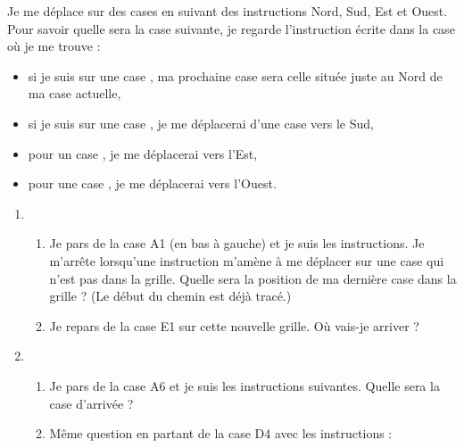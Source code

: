 \documentclass[class=report,crop=false, 12pt]{standalone}
\begin{document}
\begin{activite}

Je me déplace sur des cases en suivant des instructions Nord, Sud, Est et Ouest.
Pour savoir quelle sera la case suivante, je regarde l'instruction écrite dans la case où je me trouve :
\begin{itemize}
  \item si je suis sur une case , ma prochaine case sera celle située juste au Nord de ma case actuelle,
  \item si je suis sur une case , je me déplacerai d'une case vers le Sud,
  \item pour un case , je me déplacerai vers l'Est,
  \item pour une case , je me déplacerai vers l'Ouest.
\end{itemize}


\begin{enumerate}
  \item
  \begin{enumerate}
    \item Je pars de la case A1 (en bas à gauche) et je suis les instructions. Je m'arrête lorsqu'une instruction m'amène à me déplacer sur une case qui n'est pas dans la grille. Quelle sera la position de ma dernière case dans la grille ? (Le début du chemin est déjà tracé.)
    
    
    \item Je repars de la case E1 sur cette nouvelle grille. Où vais-je arriver ?  
      
     
  \end{enumerate} 
   
  \item
  \begin{enumerate}
    \item Je pars de la case A6 et je suis les instructions suivantes. Quelle sera la case d'arrivée ?
    
    \centerline{}
    
      
    \item Même question en partant de la case D4 avec les instructions : 
    
    \centerline{}
    

\end{enumerate}
\end{enumerate}
\end{activite}
\end{document}
